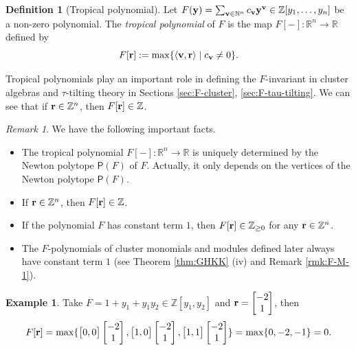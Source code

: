\documentclass[10pt]{amsart}
\theoremstyle{definition}
\newtheorem{definition}[theorem]{Definition}
\newtheorem{example}[theorem]{Example}
\theoremstyle{remark}
\newtheorem{remark}[theorem]{Remark}
\numberwithin{equation}{section}
\begin{document}
\begin{definition}[Tropical polynomial] \label{def:trop-polynomial}
Let $F({\bf y})=\sum_{{\bf v}\in\mathbb N^n}c_{\bf v}{\bf y}^{\bf v}\in\mathbb Z[y_1,\ldots,y_n]$ be a non-zero polynomial. The {\em tropical polynomial} of $F$ is the map $F[-]:\mathbb R^n\to \mathbb R$ defined by
\[F[{\bf r}]:=\max\{\langle{{\bf v},{\bf r}}\rangle\mid c_{\bf v}\neq 0\}.\]
\end{definition}
 
Tropical polynomials play an important role in defining the $F$-invariant in cluster algebras and $\tau$-tilting theory in Sections \ref{sec:F-cluster}, \ref{sec:F-tau-tilting}. We can see that if ${\bf r}\in\mathbb Z^n$, then $F[{\bf r}]\in \mathbb Z$.
\begin{remark}\label{rmk:cons-1}
We have the following important facts.
\begin{itemize}
\item[(a)] The tropical polynomial $F[-]:\mathbb R^n\to\mathbb R$ is uniquely determined by the Newton polytope $\mathsf P(F)$ of $F$. Actually, it only depends on the vertices of the Newton polytope $\mathsf P(F)$.
    \item [(b)] If ${\bf r}\in\mathbb Z^n$, then $F[{\bf r}]\in \mathbb Z$.
    \item[(c)] If the polynomial $F$ has constant term $1$, then $F[{\bf r}]\in\mathbb Z_{\geq 0}$ for any ${\bf r}\in\mathbb Z^n$.
    \item [(d)] The $F$-polynomials of cluster monomials and modules defined later always have constant term $1$ (see Theorem \ref{thm:GHKK} (iv) and Remark \ref{rmk:F-M-1}).
\end{itemize}
\end{remark}
\begin{example}
  Take  $F=1+y_1+y_1y_2\in\mathbb Z[y_1,y_2]$ and ${\bf r}=\begin{bmatrix}
     -2\\1
 \end{bmatrix}$, then
 \begin{eqnarray}
     F[{\bf r}]=\max\{
     \begin{bmatrix}
         0,0
     \end{bmatrix}\begin{bmatrix}
     -2\\1
 \end{bmatrix}, \begin{bmatrix}
         1,0
     \end{bmatrix}\begin{bmatrix}
     -2\\1
 \end{bmatrix}, \begin{bmatrix}
         1,1
     \end{bmatrix}\begin{bmatrix}
     -2\\1
 \end{bmatrix}
     \}=\max\{0,-2,-1\}=0.
     \nonumber
 \end{eqnarray}
\end{example}
\end{document}
